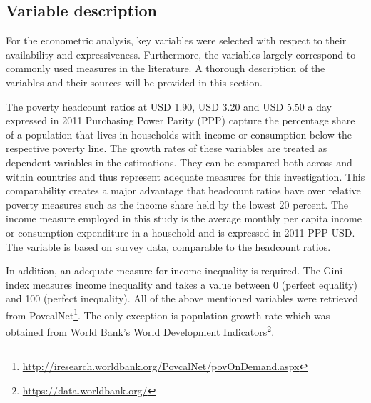 \documentclass[12pt, a4paper]{article}
\begin{document}
\subsection{Variable description} \label{variables}

For the econometric analysis, key variables were selected with respect to their availability and expressiveness. Furthermore, the variables largely correspond to commonly used measures in the literature. A thorough description of the variables and their sources will be provided in this section.

The poverty headcount ratios at USD 1.90, USD 3.20 and USD 5.50 a day expressed in 2011 Purchasing Power Parity (PPP) capture the percentage share of a population that lives in households with income or consumption below the respective poverty line. The growth rates of these variables are treated as dependent variables in the estimations. They can be compared both across and within countries and thus represent adequate measures for this investigation. This comparability creates a major advantage that headcount ratios have over relative poverty measures such as the income share held by the lowest 20 percent. The income measure employed in this study is the average monthly per capita income or consumption expenditure in a household and is expressed in 2011 PPP USD. The variable is based on survey data, comparable to the headcount ratios.

In addition, an adequate measure for income inequality is required. The Gini index measures income inequality and takes a value between 0 (perfect equality) and 100 (perfect inequality). All of the above mentioned variables were retrieved from PovcalNet\footnote{\url{http://iresearch.worldbank.org/PovcalNet/povOnDemand.aspx}}. The only exception is population growth rate which was obtained from World Bank's World Development Indicators\footnote{\url{https://data.worldbank.org/}}.
\end{document}
